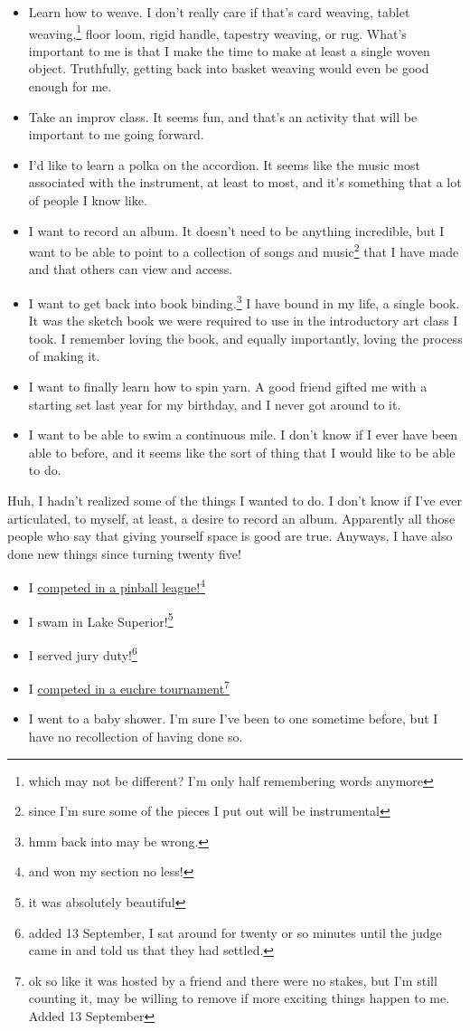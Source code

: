 \documentclass[12pt]{article}[titlepage]
\newcommand{\1}{\={a}}
\newcommand{\2}{\={e}}
\newcommand{\3}{\={\i}}
\newcommand{\4}{\=o}
\newcommand{\5}{\=u}
\newcommand{\6}{\={A}}
\renewcommand{\,}{\textsuperscript{,}}
\begin{document}
\begin{itemize} \item Learn how to weave. I don't really care if that's card weaving, tablet weaving,\footnote{which may not be different? I'm only half remembering words anymore} floor loom, rigid handle, tapestry weaving, or rug. What's important to me is that I make the time to make at least a single woven object. Truthfully, getting back into basket weaving would even be good enough for me. \item Take an improv class. It seems fun, and that's an activity that will be important to me going forward. \item I'd like to learn a polka on the accordion. It seems like the music most associated with the instrument, at least to most, and it's something that a lot of people I know like. \item I want to record an album. It doesn't need to be anything incredible, but I want to be able to point to a collection of songs and music\footnote{since I'm sure some of the pieces I put out will be instrumental} that I have made and that others can view and access. \item I want to get back into book binding.\footnote{hmm back into may be wrong.} I have bound in my life, a single book. It was the sketch book we were required to use in the introductory art class I took. I remember loving the book, and equally importantly, loving the process of making it. \item I want to finally learn how to spin yarn. A good friend gifted me with a starting set last year for my birthday, and I never got around to it. \item I want to be able to swim a continuous mile. I don't know if I ever have been able to before, and it seems like the sort of thing that I would like to be able to do. \end{itemize}
Huh, I hadn't realized some of the things I wanted to do. I don't know if I've ever articulated, to myself, at least, a desire to record an album. Apparently all those people who say that giving yourself space is good are true. Anyways, I have also done new things since turning twenty five!  \begin{itemize} \item I \href{pinball.html}{competed in a pinball league!}\footnote{and won my section no less!}
\item I swam in Lake Superior!\footnote{it was absolutely beautiful}
\item I served jury duty!\footnote{added 13 September, I sat around for twenty or so minutes until the judge came in and told us that they had settled.}
\item I \href{euchre-tournament}{competed in a euchre tournament}\footnote{ok so like it was hosted by a friend and there were no stakes, but I'm still counting it, may be willing to remove if more exciting things happen to me. Added 13 September}
\item I went to a baby shower. I'm sure I've been to one sometime before, but I have no recollection of having done so. 
\end{itemize}
\end{document}
